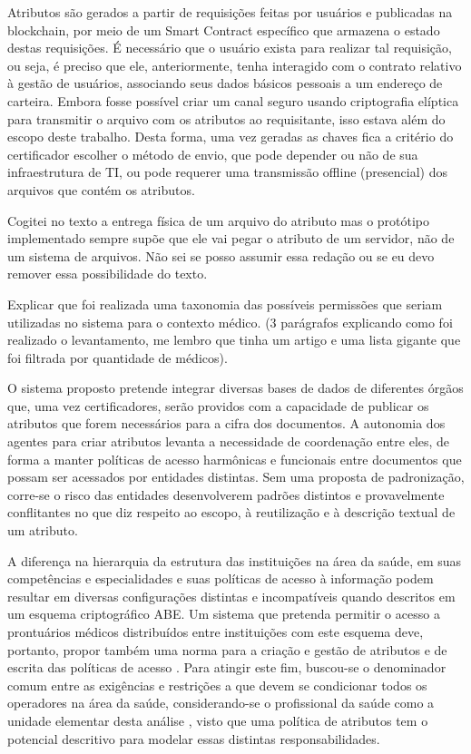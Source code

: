 \documentclass[a4paper,11pt]{article}
\begin{document}
Atributos são gerados a partir de requisições feitas por usuários e publicadas na blockchain, por meio de um Smart Contract específico que armazena o estado destas requisições. É necessário que o usuário exista para realizar tal requisição, ou seja, é preciso que ele, anteriormente, tenha interagido com o contrato relativo à gestão de usuários, associando seus dados básicos pessoais a um endereço de carteira. Embora fosse possível criar um canal seguro usando criptografia elíptica para transmitir o arquivo com os atributos ao requisitante, isso estava além do escopo deste trabalho. Desta forma, uma vez geradas as chaves fica a critério do certificador escolher o método de envio, que pode depender ou não de sua infraestrutura de TI, ou pode requerer uma transmissão offline (presencial) dos arquivos que contém os atributos.

{\color{RoyalBlue} Cogitei no texto a entrega física de um arquivo do atributo mas o protótipo implementado sempre supõe que ele vai pegar o atributo de um servidor, não de um sistema de arquivos. Não sei se posso assumir essa redação ou se eu devo remover essa possibilidade do texto.}

{\color{ForestGreen}Explicar que foi realizada uma taxonomia das possíveis permissões que seriam utilizadas no sistema para o contexto médico. (3 parágrafos explicando como foi realizado o levantamento, me lembro que tinha um artigo e uma lista gigante que foi filtrada por quantidade de médicos).}

O sistema proposto pretende integrar diversas bases de dados de diferentes órgãos que, uma vez  certificadores, serão providos com a capacidade de publicar os atributos que forem necessários para a cifra dos documentos. A autonomia dos agentes para criar atributos levanta a necessidade de coordenação entre eles, de forma a manter políticas de acesso harmônicas e funcionais entre documentos que possam ser acessados por entidades distintas. Sem uma proposta de padronização, corre-se o risco das entidades desenvolverem padrões distintos e provavelmente conflitantes no que diz respeito ao escopo, à reutilização e à descrição textual de um atributo.

A diferença na hierarquia da estrutura das instituições na área da saúde, em suas competências e especialidades e suas políticas de acesso à informação podem resultar em diversas configurações distintas e incompatíveis quando descritos em um esquema criptográfico ABE. Um sistema que pretenda permitir o acesso a prontuários médicos distribuídos entre instituições com este esquema deve, portanto, propor também uma norma para a criação e gestão de atributos e de escrita das políticas de acesso . Para atingir este fim, buscou-se o denominador comum entre as exigências e restrições a que devem se condicionar todos os operadores na área da saúde, considerando-se o profissional da saúde como a unidade elementar desta análise , visto que uma política de atributos tem o potencial descritivo para modelar essas distintas responsabilidades.
\end{document}

